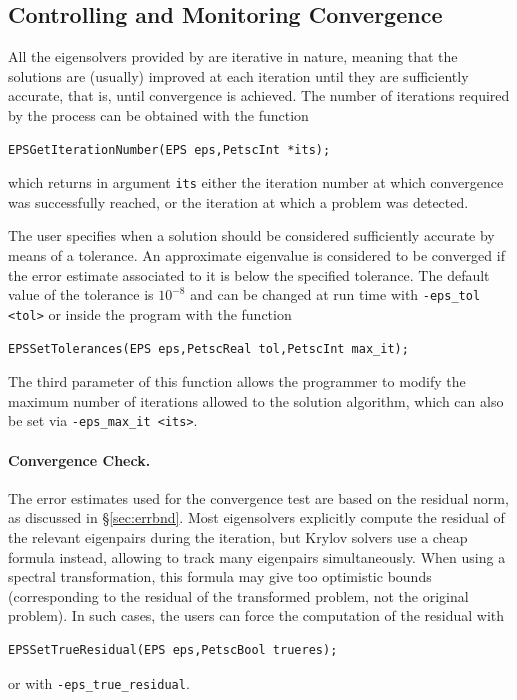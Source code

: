 \subsection{Controlling and Monitoring Convergence}
\label{sec:monitor}

	All the eigensolvers provided by \slepc are iterative in nature, meaning that the solutions are (usually) improved at each iteration until they are sufficiently accurate, that is, until convergence is achieved. The number of iterations required by the process can be obtained with the function%
	\begin{Verbatim}[fontsize=\small]
        EPSGetIterationNumber(EPS eps,PetscInt *its);
	\end{Verbatim}
which returns in argument \texttt{its} either the iteration number at which convergence was successfully reached, or the iteration at which a problem was detected. 

The user specifies when a solution should be considered sufficiently accurate by means of a tolerance. An approximate eigenvalue is considered to be converged if the error estimate associated to it is below the specified tolerance. The default value of the tolerance is $10^{-8}$ and can be changed at run time with \Verb!-eps_tol <tol>! or inside the program with the function
	\begin{Verbatim}[fontsize=\small]
	EPSSetTolerances(EPS eps,PetscReal tol,PetscInt max_it);
	\end{Verbatim}
	The third parameter of this function allows the programmer to modify the maximum number of iterations allowed to the solution algorithm, which can also be set via \Verb!-eps_max_it <its>!.

\paragraph{Convergence Check.}

The error estimates used for the convergence test are based on the residual norm, as discussed in \S\ref{sec:errbnd}. Most eigensolvers explicitly compute the residual of the relevant eigenpairs during the iteration, but Krylov solvers use a cheap formula instead, allowing to track many eigenpairs simultaneously. When using a spectral transformation, this formula may give too optimistic bounds (corresponding to the residual of the transformed problem, not the original problem). In such cases, the users can force the computation of the residual with 
	\begin{Verbatim}[fontsize=\small]
	EPSSetTrueResidual(EPS eps,PetscBool trueres);
	\end{Verbatim}
or with \Verb!-eps_true_residual!.


